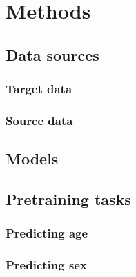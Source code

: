\documentclass[journal,twoside,web]{ieeecolor}
\begin{document}


\section{Methods}
\subsection{Data sources}
\subsubsection{Target data}
\subsubsection{Source data}
\subsection{Models}
\subsection{Pretraining tasks}
\subsubsection{Predicting age}
\subsubsection{Predicting sex}
\end{document}
